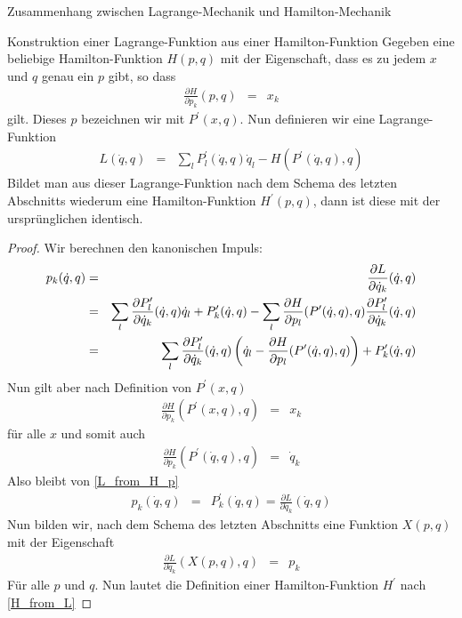 \begin{chapter}{\titlestr}
\begin{appendix}
\begin{section}{Zusammenhang zwischen Lagrange-Mechanik und Hamilton-Mechanik}
\begin{subsection}{Konstruktion einer Lagrange-Funktion aus einer Hamilton-Funktion}
Gegeben eine beliebige Hamilton-Funktion $H(p,q)$ mit der Eigenschaft, dass es zu jedem $x$ und $q$ genau ein $p$ gibt, so dass
\begin{eqnarray*}
\frac{\partial H}{\partial p_k}(p,q) &=& x_k
\end{eqnarray*}
gilt. Dieses $p$ bezeichnen wir mit $P^\prime(x,q)$. Nun definieren wir eine Lagrange-Funktion
\begin{eqnarray*}
L(\dot{q},q) &=& \sum_lP^\prime_l(\dot{q},q)\dot{q}_l-H(P^\prime(\dot{q},q),q)
\end{eqnarray*}
Bildet man aus dieser Lagrange-Funktion nach dem Schema des letzten Abschnitts wiederum eine Hamilton-Funktion $H^\prime(p,q)$, dann ist diese mit der ursprünglichen identisch.
\begin{proof}
Wir berechnen den kanonischen Impuls:
\begin{eqnarray}
\label{L_from_H_p}
p_k(\dot{q},q) &=& \frac{\partial L}{\partial \dot{q}_k}(\dot{q},q)\cr
&=& \sum_l\frac{\partial P^\prime_l}{\partial \dot{q}_k}(\dot{q},q)\dot{q}_l+P^\prime_k(\dot{q},q)
-\sum_l\frac{\partial H}{\partial p_l}(P^\prime(\dot{q},q),q)\frac{\partial P^\prime_l}{\partial \dot{q}_k}(\dot{q},q)\cr
&=& \sum_l\frac{\partial P^\prime_l}{\partial \dot{q}_k}(\dot{q},q)\left(\dot{q}_l-\frac{\partial H}{\partial p_l}(P^\prime(\dot{q},q),q)\right)+P^\prime_k(\dot{q},q)
\end{eqnarray}
Nun gilt aber nach Definition von $P^\prime(x,q)$
\begin{eqnarray*}
\frac{\partial H}{\partial p_k}(P^\prime(x,q),q) &=& x_k
\end{eqnarray*}
für alle $x$ und somit auch
\begin{eqnarray*}
\frac{\partial H}{\partial p_k}(P^\prime(\dot{q},q),q) &=& \dot{q}_k
\end{eqnarray*}
Also bleibt von \ref{L_from_H_p}
\begin{eqnarray*}
p_k(\dot{q},q) &=& P^\prime_k(\dot{q},q)= \frac{\partial L}{\partial \dot{q}_k}(\dot{q},q)
\end{eqnarray*}
Nun bilden wir, nach dem Schema des letzten Abschnitts eine Funktion $X(p,q)$ mit der Eigenschaft
\begin{eqnarray*}
\frac{\partial L}{\partial \dot{q}_k}(X(p,q),q) &=& p_k
\end{eqnarray*}
Für alle $p$ und $q$. Nun lautet die Definition einer Hamilton-Funktion $H^\prime$ nach \ref{H_from_L}

\end{proof}
\end{subsection}
\end{section}
\end{appendix}
\end{chapter}
